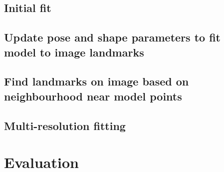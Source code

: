 \documentclass[a4paper,10pt]{article}
\begin{document}
\subsection{Initial fit}

\subsection{Update pose and shape parameters to fit model to image landmarks}

\subsection{Find landmarks on image based on neighbourhood near model points}

\subsection{Multi-resolution fitting}


\section{Evaluation}


\end{document}
